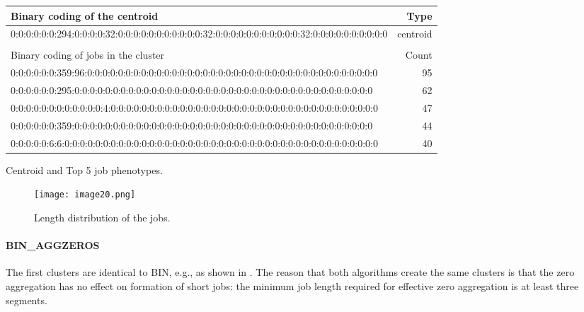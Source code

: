 \documentclass{jhps}
\begin{document}
\begin{minipage}{\textwidth}
\begingroup
  \begin{subtable}{\textwidth}
  \centering
  \begin{tiny}
    \begin{tabular}{l|r}
      \rowcolor{tblhead}
      Binary coding of the centroid                                                                                 &  Type     \\
      \hline
      0:0:0:0:0:0:294:0:0:0:0:32:0:0:0:0:0:0:0:0:0:0:0:32:0:0:0:0:0:0:0:0:0:0:0:32:0:0:0:0:0:0:0:0:0:0 &  centroid \\
      \multicolumn{2}{l}{}                                                                             \\
      \rowcolor{tblhead}
      Binary coding of jobs in the cluster                                                                      &  Count    \\
      \hline
      0:0:0:0:0:0:359:96:0:0:0:0:0:0:0:0:0:0:0:0:0:0:0:0:0:0:0:0:0:0:0:0:0:0:0:0:0:0:0:0:0:0:0:0:0:0   &  95       \\
      0:0:0:0:0:0:295:0:0:0:0:0:0:0:0:0:0:0:0:0:0:0:0:0:0:0:0:0:0:0:0:0:0:0:0:0:0:0:0:0:0:0:0:0:0:0    &  62       \\
      0:0:0:0:0:0:0:0:0:0:0:0:4:0:0:0:0:0:0:0:0:0:0:0:0:0:0:0:0:0:0:0:0:0:0:0:0:0:0:0:0:0:0:0:0:0:0:0  &  47       \\
      0:0:0:0:0:0:359:0:0:0:0:0:0:0:0:0:0:0:0:0:0:0:0:0:0:0:0:0:0:0:0:0:0:0:0:0:0:0:0:0:0:0:0:0:0:0    &  44       \\
      0:0:0:0:0:6:6:0:0:0:0:0:0:0:0:0:0:0:0:0:0:0:0:0:0:0:0:0:0:0:0:0:0:0:0:0:0:0:0:0:0:0:0:0:0:0:0:0  &  40       \\
    \end{tabular}
  \end{tiny}
  \caption{Centroid and Top 5 job phenotypes.}
  \label{tab:bin_all:top_jobs}
  \end{subtable}
\endgroup

\medskip

\begingroup
  \begin{subfigure}{\textwidth}
  \centering
  \texttt{[image: image20.png]}
  \caption{Length distribution of the jobs.}
  \label{fig:bin_all:length}
  \end{subfigure}
\endgroup

\label{fig:bin_all}
\end{minipage}

\paragraph{BIN\_AGGZEROS}
The first clusters are identical to BIN, e.g., as shown in .
The reason that both algorithms create the same clusters is that the zero aggregation has no effect on formation of short jobs: the minimum job length required for effective zero aggregation is at least three segments.
\end{document}
